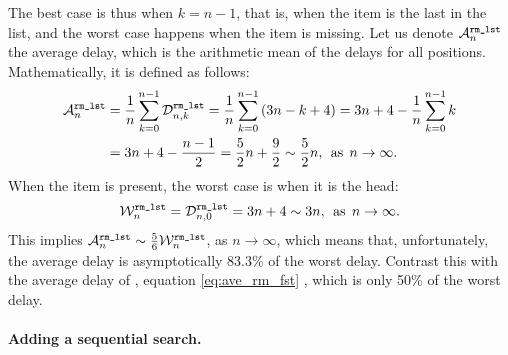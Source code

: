 The best case is thus when \(k=n-1\), that is, when the item is the
last in the list, and the worst case happens when the item is
missing. Let us denote \(\ave{rm\_lst}{n}\) the average delay, which
is the arithmetic mean of the delays for all
positions. Mathematically, it is defined as follows:
\begin{align}
\ave{rm\_lst}{n}
  &= \frac{1}{n}\sum_{k=0}^{n-1}{\comp{rm\_lst}{n,k}}
   = \frac{1}{n}\sum_{k=0}^{n-1}{(3n-k+4)}
   = 3n+4 - \frac{1}{n}\sum_{k=0}^{n-1}{k}\notag\\
  &= 3n + 4 - \frac{n-1}{2}
   = \frac{5}{2}{n} + \frac{9}{2}
     \mathrel{\sim} \frac{5}{2}{n},\,\; \text{as} \,\;
     n \rightarrow \infty.\label{eq:ave_rm_lst}
\end{align}
When the item is present, the worst case is when it is the head:
\begin{equation*}
\worst{rm\_lst}{n}
  = \comp{rm\_lst}{n,0}
  = 3n+4 \mathrel{\sim} 3n,\,\; \text{as} \,\; n \rightarrow \infty.
\end{equation*}
This implies \(\ave{rm\_lst}{n} \mathrel{\sim} \tfrac{5}{6}
\worst{rm\_lst}{n}\), as \(n \rightarrow \infty\), which means that,
unfortunately, the average delay is asymptotically 83.3\% of the worst
delay. Contrast this with the average delay of ,
equation \eqref{eq:ave_rm_fst} , which is only
50\% of the worst delay.

\medskip

\paragraph{Adding a sequential search.}

